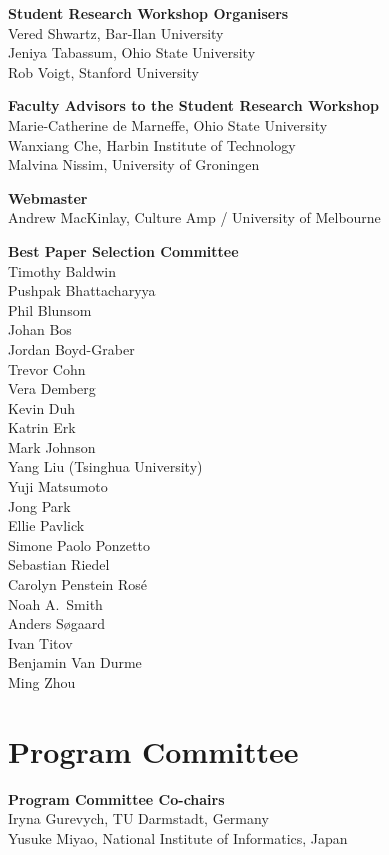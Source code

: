 {\bf Student Research Workshop Organisers} \\
Vered Shwartz, Bar-Ilan University\\
Jeniya Tabassum, Ohio State University\\
Rob Voigt, Stanford University

{\bf Faculty Advisors to the Student Research Workshop} \\
Marie-Catherine de Marneffe, Ohio State University\\
Wanxiang Che, Harbin Institute of Technology\\
Malvina Nissim, University of Groningen

{\bf Webmaster} \\
Andrew MacKinlay, Culture Amp / University of Melbourne

{\bf Best Paper Selection Committee} \\
Timothy	Baldwin \\
Pushpak	Bhattacharyya \\
Phil	Blunsom \\
Johan	Bos \\
Jordan	Boyd-Graber \\
Trevor	Cohn \\
Vera	Demberg \\
Kevin	Duh \\
Katrin	Erk \\
Mark	Johnson \\
Yang	Liu (Tsinghua University)\\
Yuji	Matsumoto \\
Jong	Park \\
Ellie	Pavlick \\
Simone Paolo	Ponzetto \\
Sebastian	Riedel \\
Carolyn	Penstein Rosé \\
Noah A.~Smith \\
Anders	Søgaard \\
Ivan	Titov \\
Benjamin	Van Durme \\
Ming	Zhou


\clearpage
\section{Program Committee}
\setlength{\parindent}{0pt}

{\bf Program Committee Co-chairs} \\
Iryna Gurevych, TU Darmstadt, Germany \\
Yusuke Miyao, National Institute of Informatics, Japan

